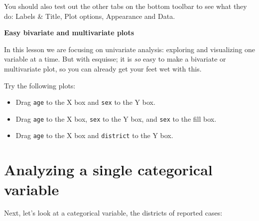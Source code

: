 \documentclass[
  letterpaper,
  DIV=11,
  numbers=noendperiod]{scrreprt}
\newenvironment{Shaded}{\begin{snugshade}}{\end{snugshade}}
\newcommand{\DocumentationTok}[1]{\textcolor[rgb]{0.37,0.37,0.37}{\textit{#1}}}
\newcommand{\NormalTok}[1]{\textcolor[rgb]{0.00,0.23,0.31}{#1}}
\newcommand{\SpecialCharTok}[1]{\textcolor[rgb]{0.37,0.37,0.37}{#1}}
\begin{document}
You should also test out the other tabs on the bottom toolbar to see
what they do: Labels \& Title, Plot options, Appearance and Data.

\begin{tcolorbox}[enhanced jigsaw, title=\textcolor{quarto-callout-note-color}{\faInfo}\hspace{0.5em}{Challenge}, colbacktitle=quarto-callout-note-color!10!white, leftrule=.75mm, arc=.35mm, opacityback=0, bottomrule=.15mm, rightrule=.15mm, toptitle=1mm, breakable, toprule=.15mm, colback=white, coltitle=black, colframe=quarto-callout-note-color-frame, bottomtitle=1mm, titlerule=0mm, left=2mm, opacitybacktitle=0.6]

\textbf{Easy bivariate and multivariate plots}

In this lesson we are focusing on univariate analysis: exploring and
visualizing one variable at a time. But with esquisse; it is \emph{so}
easy to make a bivariate or multivariate plot, so you can already get
your feet wet with this.

Try the following plots:

\begin{itemize}
\item
  Drag \texttt{age} to the X box and \texttt{sex} to the Y box.
\item
  Drag \texttt{age} to the X box, \texttt{sex} to the Y box, and
  \texttt{sex} to the fill box.
\item
  Drag \texttt{age} to the X box and \texttt{district} to the Y box.
\end{itemize}

\end{tcolorbox}

\section{Analyzing a single categorical
variable}\label{analyzing-a-single-categorical-variable}

Next, let's look at a categorical variable, the districts of reported
cases:

\begin{Shaded}
\end{Shaded}
\end{document}
